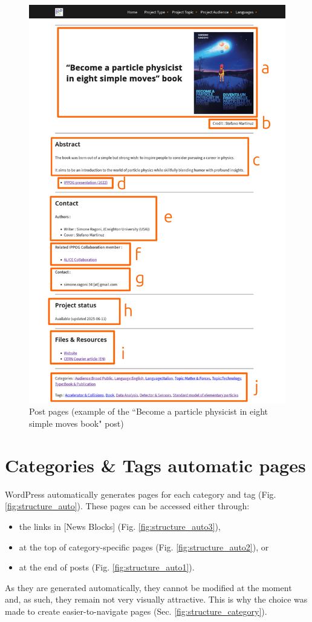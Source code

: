 \begin{figure}[p]
    \centering
    \includegraphics[width=.85\linewidth]{Image/Architecture/structure_project.png}
    \caption{Post pages (example of the “Become a particle physicist in eight simple moves book" post)}
    \label{fig:structure_post}
\end{figure}
\newpage

\section{Categories \& Tags automatic pages}\label{sec:structure_auto}

WordPress automatically generates pages for each category and tag (Fig. \ref{fig:structure_auto}). These pages can be accessed either through: 
\begin{itemize}
    \item the links in [News Blocks] (Fig. \ref{fig:structure_auto3}),
    \item at the top of category-specific pages (Fig. \ref{fig:structure_auto2}), or
    \item at the end of posts (Fig. \ref{fig:structure_auto1}).
\end{itemize}   
As they are generated automatically, they cannot be modified at the moment and, as such, they remain not very visually attractive. This is why the choice was made to create easier-to-navigate pages (Sec. \ref{fig:structure_category}).

